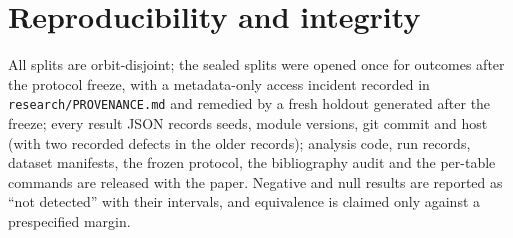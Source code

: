 \documentclass[11pt]{article}
\begin{document}
\section{Reproducibility and integrity}
\label{sec:repro}

All splits are orbit-disjoint; the sealed splits were opened once for outcomes after the
protocol freeze, with a metadata-only access incident recorded in
\texttt{research/PROVENANCE.md} and remedied by a fresh holdout generated after the freeze;
every result JSON records seeds, module versions, git commit and host (with two recorded
defects in the older records); analysis code, run records, dataset manifests, the frozen
protocol, the bibliography audit and the per-table commands are released with the paper.
Negative and null results are reported as ``not detected'' with their intervals, and
equivalence is claimed only against a prespecified margin.
\end{document}
